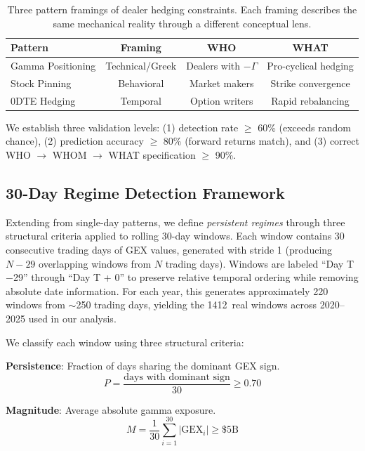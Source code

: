 \documentclass[jrfm,article,accept,moreauthors,pdftex]{Definitions/mdpi}
\begin{document}
\begin{table}[H]
\centering
\caption{Three pattern framings of dealer hedging constraints. Each framing describes the same mechanical reality through a different conceptual lens.}
\label{tab:patterns}
\begin{tabularx}{\textwidth}{@{}LCCC@{}}
\toprule
\textbf{Pattern} & \textbf{Framing} & \textbf{WHO} & \textbf{WHAT} \\
\midrule
Gamma Positioning & Technical/Greek & Dealers with $-\Gamma$ & Pro-cyclical hedging \\
Stock Pinning & Behavioral & Market makers & Strike convergence \\
0DTE Hedging & Temporal & Option writers & Rapid rebalancing \\
\bottomrule
\end{tabularx}
\end{table}

We establish three validation levels: (1) detection rate $\geq$ 60\% (exceeds random chance), (2) prediction accuracy $\geq$ 80\% (forward returns match), and (3) correct WHO $\rightarrow$ WHOM $\rightarrow$ WHAT specification $\geq$ 90\%.

\subsection{30-Day Regime Detection Framework}
\label{subsec:regime_method}

Extending from single-day patterns, we define \textit{persistent regimes} through three structural criteria applied to rolling 30-day windows. Each window contains 30 consecutive trading days of GEX values, generated with stride 1 (producing $N - 29$ overlapping windows from $N$ trading days). Windows are labeled ``Day T$-$29'' through ``Day T + 0'' to preserve relative temporal ordering while removing absolute date information. For each year, this generates approximately 220 windows from $\sim$250 trading days, yielding the 1412~real windows across 2020--2025 used in our analysis.

We classify each window using three structural criteria:

\textbf{Persistence}: Fraction of days sharing the dominant GEX sign.
\begin{equation}
P = \frac{\text{days with dominant sign}}{30} \geq 0.70
\end{equation}

\textbf{Magnitude}: Average absolute gamma exposure.
\begin{equation}
M = \frac{1}{30}\sum_{i=1}^{30} |\text{GEX}_i| \geq \$5\text{B}
\end{equation}
\end{document}
